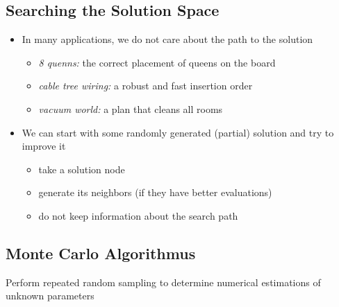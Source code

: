 \documentclass[conference, a4paper]{styles/acmsiggraph}
\begin{document}
    \subsection{Searching the Solution Space}
        \begin{itemize}
            \item In many applications, we do not care about the path to the solution
                \begin{itemize}
                    \item \textit{8 quenns:} the correct placement of queens on the board
                    \item \textit{cable tree wiring:} a robust and fast insertion order
                    \item \textit{vacuum world:} a plan that cleans all rooms
                \end{itemize}
            \item We can start with some randomly generated (partial) solution and try to improve it
                \begin{itemize}
                    \item take a solution node
                    \item generate its neighbors (if they have better evaluations)
                    \item do not keep information about the search path
                \end{itemize}
        \end{itemize}
    
    
    
    
    
    
    \subsection{Monte Carlo Algorithmus}
        Perform repeated random sampling to determine numerical estimations of unknown parameters
    
\end{document}

